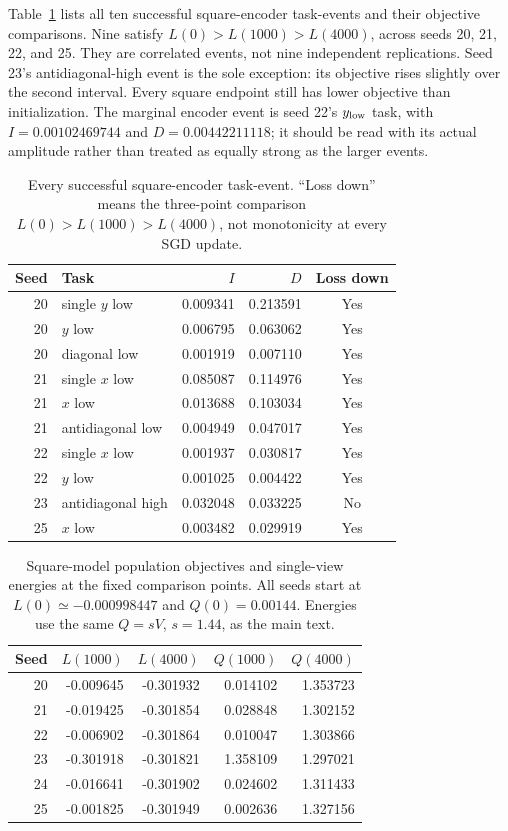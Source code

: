Table~\ref{supp:rebound-loss-events} lists all ten successful square-encoder task-events and their objective comparisons. Nine satisfy $L(0)>L(1000)>L(4000)$, across seeds 20, 21, 22, and 25. They are correlated events, not nine independent replications. Seed 23's antidiagonal-high event is the sole exception: its objective rises slightly over the second interval. Every square endpoint still has lower objective than initialization. The marginal encoder event is seed 22's $y_{\rm low}$ task, with $I=0.00102469744$ and $D=0.00442211118$; it should be read with its actual amplitude rather than treated as equally strong as the larger events.

\begin{table}[t]
\centering\small
\caption{Every successful square-encoder task-event. ``Loss down'' means the three-point comparison $L(0)>L(1000)>L(4000)$, not monotonicity at every SGD update.}
\label{supp:rebound-loss-events}
\setlength{\tabcolsep}{3pt}
\begin{tabular}{rlrrc}
\toprule
Seed&Task&$I$&$D$&Loss down\\\midrule
20&single $y$ low&0.009341&0.213591&Yes\\
20&$y$ low&0.006795&0.063062&Yes\\
20&diagonal low&0.001919&0.007110&Yes\\
21&single $x$ low&0.085087&0.114976&Yes\\
21&$x$ low&0.013688&0.103034&Yes\\
21&antidiagonal low&0.004949&0.047017&Yes\\
22&single $x$ low&0.001937&0.030817&Yes\\
22&$y$ low&0.001025&0.004422&Yes\\
23&antidiagonal high&0.032048&0.033225&No\\
25&$x$ low&0.003482&0.029919&Yes\\
\bottomrule
\end{tabular}
\end{table}

\begin{table}[t]
\centering\small
\caption{Square-model population objectives and single-view energies at the fixed comparison points. All seeds start at $L(0)\simeq-0.000998447$ and $Q(0)=0.00144$. Energies use the same $Q=sV$, $s=1.44$, as the main text.}
\label{supp:rebound-loss-energy}
\setlength{\tabcolsep}{3pt}
\begin{tabular}{rrrrr}
\toprule
Seed&$L(1000)$&$L(4000)$&$Q(1000)$&$Q(4000)$\\\midrule
20&-0.009645&-0.301932&0.014102&1.353723\\
21&-0.019425&-0.301854&0.028848&1.302152\\
22&-0.006902&-0.301864&0.010047&1.303866\\
23&-0.301918&-0.301821&1.358109&1.297021\\
24&-0.016641&-0.301902&0.024602&1.311433\\
25&-0.001825&-0.301949&0.002636&1.327156\\
\bottomrule
\end{tabular}
\end{table}

